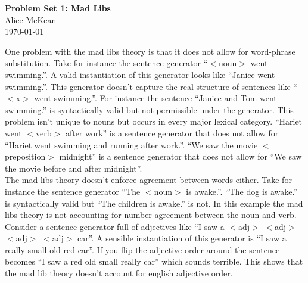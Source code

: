 \documentclass[20pt]{article}
\begin{document}
\Large\textbf{Problem Set 1: Mad Libs} \\
\normalsize
Alice McKean \\
\today

One problem with the mad libs theory is that it does not allow for word-phrase
substitution. Take for instance the sentence generator ``$<$noun$>$ went
swimming.''. A valid instantiation of this generator looks like ``Janice went
swimming.''.  This generator doesn't capture the real structure of sentences like
``$<$x$>$ went swimming.''. For instance the sentence ``Janice and Tom went
swimming.'' is syntactically valid but not permissible under the generator. This
problem isn't unique to nouns but occurs in every major lexical category.
``Hariet went $<$verb$>$ after work'' is a sentence generator that does not
allow for
``Hariet went swimming and running after
work.''.
``We saw the movie $<$preposition$>$ midnight'' is a sentence generator that
does not allow for ``We saw the movie before and after midnight''.
\\

The mad libs theory doesn't enforce agreement between words either. Take for
instance the sentence generator ``The $<$noun$>$ is awake.''.  ``The dog is awake.'' is
syntactically valid but ``The children is awake.'' is not. In this example the mad
libs theory is not accounting for number agreement between the noun and verb. \\

Consider a sentence generator full of adjectives like ``I saw a $<$adj$>$
$<$adj$>$ $<$adj$>$ $<$adj$>$ car''. A sensible instantiation of this generator
is ``I saw a really small old red car''. If you flip the adjective order around 
the sentence becomes ``I saw a red old small really car'' which sounds terrible.
This shows that the mad lib theory doesn't account for english adjective order.
\end{document}
